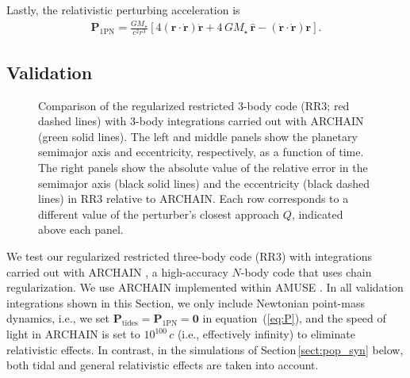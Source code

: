 \documentclass[iop,usenatbib]{emulateapj}
\renewcommand{\S}{Section}
\newcommand{\ve}[1]{\boldsymbol{#1}}
\newcommand{\unit}[1]{\hat{\boldsymbol{#1}}}
\begin{document}
Lastly, the relativistic perturbing acceleration is \citep{1938AnMat..39...65E}
\begin{align}
\ve{P}_\mathrm{1PN} = \frac{G M_\star}{c^2 r^3} \left [4 \left ( \ve{r} \cdot \dot{\ve{r}} \right ) \dot{\ve{r}} +4\, G M_\star \, \unit{r} - \left( \dot{\ve{r}} \cdot \dot{\ve{r}} \right ) \ve{r} \right ].
\end{align}



\subsection{Validation}
\label{sect:meth:val}

\begin{figure*}
\center
\iftoggle{ApJFigs}{
\texttt{[image: elements\_Q\_1.0.eps]}
\texttt{[image: elements\_Q\_3.0.eps]}
\texttt{[image: elements\_Q\_10.0.eps]}
}{
\texttt{[image: figs/elements\_Q\_1.0.eps]}
\texttt{[image: figs/elements\_Q\_3.0.eps]}
\texttt{[image: figs/elements\_Q\_10.0.eps]}
}
\caption {Comparison of the regularized restricted 3-body code (\textsc{RR3}; red dashed lines) with 3-body integrations carried out with \textsc{ARCHAIN} (green solid lines). The left and middle panels show the planetary semimajor axis and eccentricity, respectively, as a function of time. The right panels show the absolute value of the relative error in the semimajor axis (black solid lines) and the eccentricity (black dashed lines) in \textsc{RR3} relative to \textsc{ARCHAIN}. Each row corresponds to a different value of the perturber's closest approach $Q$, indicated above each panel. }
\label{fig:val}
\end{figure*}

We test our regularized restricted three-body code (\textsc{RR3}) with integrations carried out with \textsc{ARCHAIN} \citep{2006MNRAS.372..219M,2008AJ....135.2398M}, a high-accuracy $N$-body code that uses chain regularization. We use \textsc{ARCHAIN} implemented within \textsc{AMUSE} \citep{2013CoPhC.183..456P,2013A&A...557A..84P}. In all validation integrations shown in this Section, we only include Newtonian point-mass dynamics, i.e., we set $\ve{P}_\mathrm{tides} = \ve{P}_\mathrm{1PN} = \ve{0}$ in equation~(\ref{eq:P}), and the speed of light in \textsc{ARCHAIN} is set to $10^{100}\,c$ (i.e., effectively infinity) to eliminate relativistic effects. In contrast, in the simulations of \S\,\ref{sect:pop_syn} below, both tidal and general relativistic effects are taken into account. 
\end{document}
